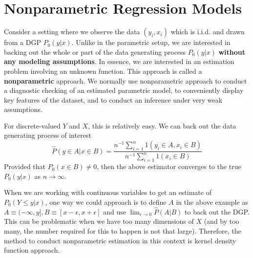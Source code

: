 \documentclass[12pt]{article}
\theoremstyle{definition}
\theoremstyle{property}
\theoremstyle{assumption}
\theoremstyle{example}
\theoremstyle{comment}
\begin{document}
\section{Nonparametric Regression Models}
Consider a setting where we observe the data $(y_i,x_i)$ which is i.i.d. and drawn from a DGP $P_0(y|x)$. Unlike in the parametric setup, we are interested in backing out the whole or part of the data generating process $P_0(y|x)$ \textbf{without any modeling assumptions}. In essence, we are interested in an estimation problem involving an unknown function. This approach is called a \textbf{nonparametric} approach. We normally use nonparametric approach to conduct a diagnostic checking of an estimated parametric model, to conveniently display key features of the dataset, and to conduct an inference under very weak assumptions. \par
For discrete-valued $Y$ and $X$, this is relatively easy. We can back out the data generating process of interest
\[
\hat{P}(y\in A| x\in B)=\frac{n^{-1}\sum_{i=1}^n1(y_i\in A, x_i\in B) }{n^{-1}\sum_{i=1}^n1(x_i\in B)}
\]
Provided that $P_0(x\in B)\neq 0$, then the above estimator converges to the true $P_0(y|x)$ as $n\to\infty$.
\par
When we are working with continuous variables to get an estimate of $P_0(Y\leq y|x)$, one way we could approach is to define $A$ in the above example as $A\equiv (-\infty, y], B\equiv[x-\epsilon, x+\epsilon]$ and use $\lim_{\epsilon\to0}\hat{P}(A|B)$ to back out the DGP. This can be problematic when we have too many dimensions of $X$ (and by too many, the number required for this to happen is not that large). Therefore, the method to conduct nonparametric estimation in this context is kernel density function approach. 
\end{document}

